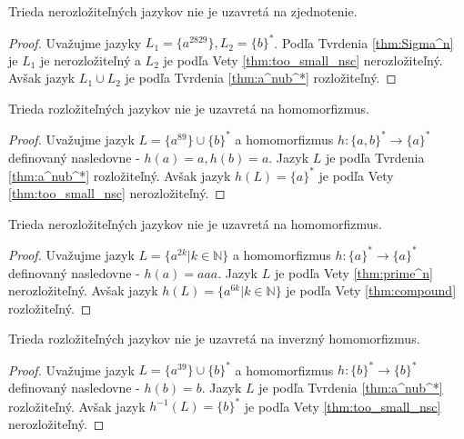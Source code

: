 \begin{proposition}
Trieda nerozložiteľných jazykov nie je uzavretá na zjednotenie.
\end{proposition}

\begin{proof}
Uvažujme jazyky $ L_1 = \lbrace a^{2829} \rbrace, L_2 = \lbrace b \rbrace^* $. Podľa Tvrdenia \ref{thm:Sigma^n} je $ L_1 $ je nerozložiteľný a $ L_2 $ je podľa Vety \ref{thm:too_small_nsc} nerozložiteľný. Avšak jazyk $ L_1 \cup L_2 $ je podľa Tvrdenia \ref{thm:a^nub^*} rozložiteľný.
\end{proof}

\begin{proposition}
Trieda rozložiteľných jazykov nie je uzavretá na homomorfizmus.
\end{proposition}

\begin{proof}
Uvažujme jazyk $ L = \lbrace a^{89} \rbrace \cup \lbrace b \rbrace^* $ a homomorfizmus $ h : \lbrace a,b \rbrace^* \rightarrow \lbrace a \rbrace^* $ definovaný nasledovne - $ h(a) = a, h(b) = a $. Jazyk $ L $ je podľa Tvrdenia \ref{thm:a^nub^*} rozložiteľný. Avšak jazyk $ h(L) = \lbrace a \rbrace^*$ je podľa Vety \ref{thm:too_small_nsc} nerozložiteľný.
\end{proof}

\begin{proposition}
Trieda nerozložiteľných jazykov nie je uzavretá na homomorfizmus.
\end{proposition}

\begin{proof}
Uvažujme jazyk $ L = \lbrace a^{2k} | k \in \mathbb{N} \rbrace $ a homomorfizmus $ h : \lbrace a \rbrace^* \rightarrow \lbrace a \rbrace^* $ definovaný nasledovne - $ h(a) = aaa $. Jazyk $ L $ je podľa Vety \ref{thm:prime^n} nerozložiteľný. Avšak jazyk $ h(L) = \lbrace a^{6k} | k \in \mathbb{N} \rbrace $ je podľa Vety \ref{thm:compound} rozložiteľný.
\end{proof}

\begin{proposition}
Trieda rozložiteľných jazykov nie je uzavretá na inverzný homomorfizmus.
\end{proposition}

\begin{proof}
Uvažujme jazyk $ L = \lbrace a^{39} \rbrace \cup \lbrace b \rbrace^* $ a homomorfizmus $ h : \lbrace b \rbrace^* \rightarrow \lbrace b \rbrace^* $ definovaný nasledovne - $ h(b) = b $. Jazyk $ L $ je podľa Tvrdenia \ref{thm:a^nub^*} rozložiteľný. Avšak jazyk $ h^{-1}(L) = \lbrace b \rbrace^*$ je podľa Vety \ref{thm:too_small_nsc} nerozložiteľný.
\end{proof}

